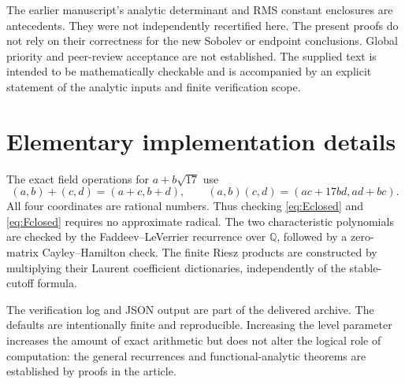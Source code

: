 \documentclass[11pt,a4paper]{article}
\theoremstyle{definition}
\theoremstyle{remark}
\newcommand{\Q}{\mathbb Q}
\numberwithin{equation}{section}
\begin{document}
The earlier manuscript's analytic determinant and RMS constant enclosures
are antecedents. They were not independently recertified here. The present
proofs do not rely on their correctness for the new Sobolev or endpoint
conclusions. Global priority and peer-review acceptance are not established.
The supplied text is intended to be mathematically checkable and is
accompanied by an explicit statement of the analytic inputs and finite
verification scope.

\section{Elementary implementation details}
\label{app:implementation}
The exact field operations for $a+b\sqrt{17}$ use
\[
 (a,b)+(c,d)=(a+c,b+d),\qquad
 (a,b)(c,d)=(ac+17bd,ad+bc).
\]
All four coordinates are rational numbers. Thus checking
\eqref{eq:Eclosed} and \eqref{eq:Fclosed} requires no approximate radical.
The two characteristic polynomials are checked by the
Faddeev--LeVerrier recurrence over $\Q$, followed by a zero-matrix
Cayley--Hamilton check. The finite Riesz products are constructed by
multiplying their Laurent coefficient dictionaries, independently of the
stable-cutoff formula.

The verification log and JSON output are part of the delivered archive.
The defaults are intentionally finite and reproducible. Increasing the
level parameter increases the amount of exact arithmetic but does not
alter the logical role of computation: the general recurrences and
functional-analytic theorems are established by proofs in the article.
\end{document}
